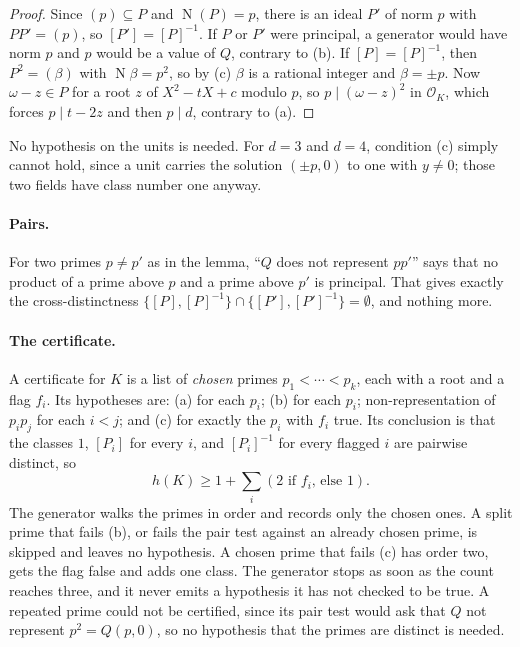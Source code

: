 \documentclass[11pt]{article}
\theoremstyle{definition}
\newcommand{\OK}{\mathcal{O}_K}
\newcommand{\Nm}{\operatorname{N}}
\begin{document}
{\begin{proof}
Since $(p) \subseteq P$ and $\Nm(P) = p$, there is an ideal $P'$ of norm $p$ with $PP' = (p)$, so $[P'] = [P]^{-1}$. If $P$ or $P'$ were principal, a generator would have norm $p$ and $p$ would be a value of $Q$, contrary to (b). If $[P] = [P]^{-1}$, then $P^2 = (\beta)$ with $\Nm\beta = p^2$, so by (c) $\beta$ is a rational integer and $\beta = \pm p$. Now $\omega - z \in P$ for a root $z$ of $X^2 - tX + c$ modulo $p$, so $p \mid (\omega - z)^2$ in $\OK$, which forces $p \mid t - 2z$ and then $p \mid d$, contrary to (a).
\end{proof}

No hypothesis on the units is needed. For $d = 3$ and $d = 4$, condition (c) simply cannot hold, since a unit carries the solution $(\pm p, 0)$ to one with $y \ne 0$; those two fields have class number one anyway.

\paragraph{Pairs.} For two primes $p \ne p'$ as in the lemma, ``$Q$ does not represent $pp'$'' says that no product of a prime above $p$ and a prime above $p'$ is principal. That gives exactly the cross-distinctness $\{[P], [P]^{-1}\} \cap \{[P'], [P']^{-1}\} = \emptyset$, and nothing more.

\paragraph{The certificate.} A certificate for $K$ is a list of \emph{chosen} primes $p_1 < \cdots < p_k$, each with a root and a flag $f_i$. Its hypotheses are: (a) for each $p_i$; (b) for each $p_i$; non-representation of $p_ip_j$ for each $i < j$; and (c) for exactly the $p_i$ with $f_i$ true. Its conclusion is that the classes $1$, $[P_i]$ for every $i$, and $[P_i]^{-1}$ for every flagged $i$ are pairwise distinct, so
\[
h(K) \ge 1 + \sum_i (\text{$2$ if $f_i$, else $1$}).
\]
The generator walks the primes in order and records only the chosen ones. A split prime that fails (b), or fails the pair test against an already chosen prime, is skipped and leaves no hypothesis. A chosen prime that fails (c) has order two, gets the flag false and adds one class. The generator stops as soon as the count reaches three, and it never emits a hypothesis it has not checked to be true. A repeated prime could not be certified, since its pair test would ask that $Q$ not represent $p^2 = Q(p, 0)$, so no hypothesis that the primes are distinct is needed.

}
\end{document}
